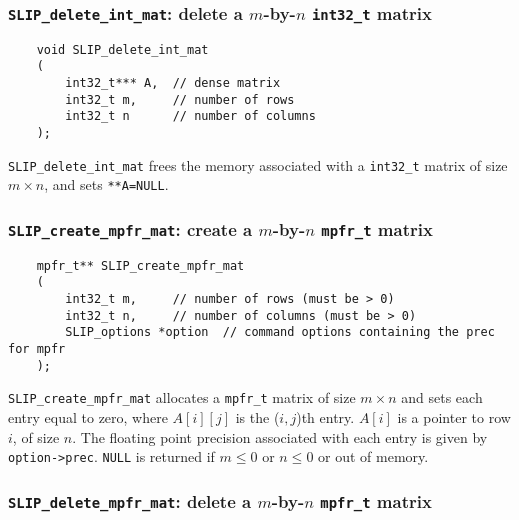 \documentclass[12pt]{article}
\theoremstyle{definition}
\begin{document}
\cprotect\subsubsection{\verb|SLIP_delete_int_mat|: delete a $m$-by-$n$ \verb|int32_t| matrix}

\begin{mdframed}[userdefinedwidth=6in]
{\footnotesize
\begin{verbatim}
    void SLIP_delete_int_mat
    (
        int32_t*** A,  // dense matrix
        int32_t m,     // number of rows
        int32_t n      // number of columns
    );
\end{verbatim}
} \end{mdframed}

\verb|SLIP_delete_int_mat| frees the memory associated with a \verb|int32_t|
matrix of size $m \times n$, and sets \verb|**A=NULL|.

\cprotect\subsubsection{\verb|SLIP_create_mpfr_mat|: create a $m$-by-$n$ \verb|mpfr_t| matrix}
\label{ss:create_mpfr_mat}

\begin{mdframed}[userdefinedwidth=6in]
{\footnotesize
\begin{verbatim}
    mpfr_t** SLIP_create_mpfr_mat
    (
        int32_t m,     // number of rows (must be > 0)
        int32_t n,     // number of columns (must be > 0)
        SLIP_options *option  // command options containing the prec for mpfr
    );
\end{verbatim}
} \end{mdframed}


\verb|SLIP_create_mpfr_mat| allocates a \verb|mpfr_t| matrix of size $m \times
n$ and sets each entry equal to zero, where $A[i][j]$ is the ($i,j$)th entry.
$A[i]$ is a pointer to row $i$, of size $n$. The floating point precision
associated with each entry is given by \verb|option->prec|. \verb|NULL| is returned if
$m \le 0 $ or $n\le 0$ or out of memory.


\cprotect\subsubsection{\verb|SLIP_delete_mpfr_mat|: delete a $m$-by-$n$ \verb|mpfr_t| matrix}
\end{document}
